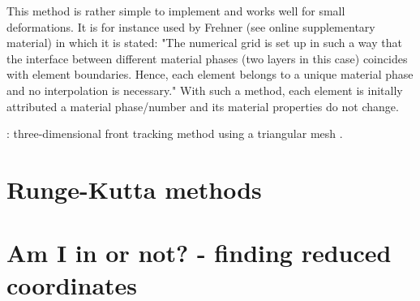 This method is rather simple to implement and works well for small deformations. It is 
for instance used by Frehner \cite{freh14} (see online supplementary material) in which it is 
stated: "The numerical grid is set up in such a way that the interface
between different material phases (two layers in this case) coincides with element boundaries. Hence, each
element belongs to a unique material phase and no interpolation is necessary."
With such a method, each element is initally attributed a material phase/number and its material
properties do not change. 


\vspace{2cm} 

\Literature: three-dimensional front tracking method using a triangular mesh \cite{sclo03}.

\section{Runge-Kutta methods \label{ss:rkm}}
 

\section{Am I in or not? - finding reduced coordinates}\label{sec:amiin}
 
